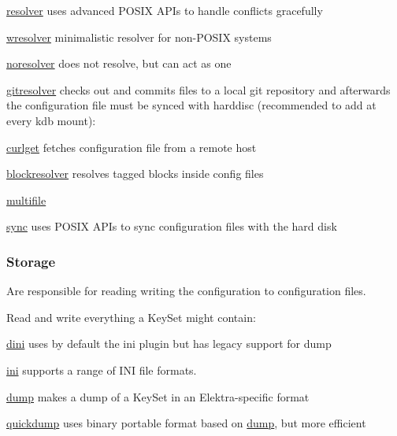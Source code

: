 \begin{DoxyItemize}
\item \hyperlink{md_src_plugins_resolver_README_src_plugins_resolver_README_md}{resolver} uses advanced P\+O\+S\+IX A\+P\+Is to handle conflicts gracefully
\item \hyperlink{md_src_plugins_wresolver_README_src_plugins_wresolver_README_md}{wresolver} minimalistic resolver for non-\/\+P\+O\+S\+IX systems
\item \hyperlink{md_src_plugins_noresolver_README_src_plugins_noresolver_README_md}{noresolver} does not resolve, but can act as one
\item \hyperlink{md_src_plugins_gitresolver_README_src_plugins_gitresolver_README_md}{gitresolver} checks out and commits files to a local git repository and afterwards the configuration file must be synced with harddisc (recommended to add at every kdb mount)\+:
\item \hyperlink{md_src_plugins_curlget_README_src_plugins_curlget_README_md}{curlget} fetches configuration file from a remote host
\item \hyperlink{md_src_plugins_blockresolver_README_src_plugins_blockresolver_README_md}{blockresolver} resolves tagged blocks inside config files
\item \hyperlink{md_src_plugins_multifile_README_src_plugins_multifile_README_md}{multifile}
\item \hyperlink{md_src_plugins_sync_README_src_plugins_sync_README_md}{sync} uses P\+O\+S\+IX A\+P\+Is to sync configuration files with the hard disk
\end{DoxyItemize}

\subsubsection*{Storage}

Are responsible for reading writing the configuration to configuration files.

Read and write everything a Key\+Set might contain\+:


\begin{DoxyItemize}
\item \hyperlink{md_src_plugins_dini_README_src_plugins_dini_README_md}{dini} uses by default the ini plugin but has legacy support for dump
\item \hyperlink{md_src_plugins_ini_README_src_plugins_ini_README_md}{ini} supports a range of I\+NI file formats.
\item \hyperlink{md_src_plugins_dump_README_src_plugins_dump_README_md}{dump} makes a dump of a Key\+Set in an Elektra-\/specific format
\item \hyperlink{md_src_plugins_quickdump_README_src_plugins_quickdump_README_md}{quickdump} uses binary portable format based on \hyperlink{md_src_plugins_dump_README_src_plugins_dump_README_md}{dump}, but more efficient
\end{DoxyItemize}

